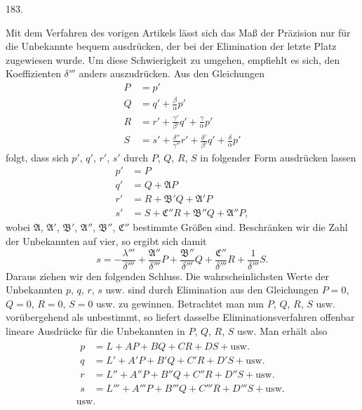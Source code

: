 \begin{center}\hypertarget{native-256-article183}{}183.\end{center}
Mit dem Verfahren des vorigen Artikels lässt sich das Maß der Präzision nur für die Unbekannte bequem ausdrücken, der bei der Elimination der letzte Platz zugewiesen wurde. Um diese Schwierigkeit zu umgehen, empfiehlt es sich, den Koeffizienten $\delta'''$ anders auszudrücken. Aus den Gleichungen
\[
\begin{aligned}
P&=p'\\
Q&=q'+\frac{\beta}{\alpha}p'\\
R&=r'+\frac{\gamma'}{\beta'}q'+\frac{\gamma}{\alpha}p'\\
S&=s'+\frac{\delta''}{\gamma''}r'+\frac{\delta'}{\beta'}q'+\frac{\delta}{\alpha}p'
\end{aligned}
\]
folgt, dass sich $p'$, $q'$, $r'$, $s'$ durch $P$, $Q$, $R$, $S$ in folgender Form ausdrücken lassen
\[
\begin{aligned}
p'&=P\\
q'&=Q+\mathfrak{A}P\\
r'&=R+\mathfrak{B}'Q+\mathfrak{A}'P\\
s'&=S+\mathfrak{C}''R+\mathfrak{B}''Q+\mathfrak{A}''P,
\end{aligned}
\]
wobei $\mathfrak{A}$, $\mathfrak{A}'$, $\mathfrak{B}'$, $\mathfrak{A}''$, $\mathfrak{B}''$, $\mathfrak{C}''$ bestimmte Größen sind. Beschränken wir die Zahl der Unbekannten auf vier, so ergibt sich damit
\[
s=-\frac{\lambda'''}{\delta'''}+\frac{\mathfrak{A}''}{\delta'''}P
+\frac{\mathfrak{B}''}{\delta'''}Q+\frac{\mathfrak{C}''}{\delta'''}R
+\frac{1}{\delta'''}S.
\]
Daraus ziehen wir den folgenden Schluss. Die wahrscheinlichsten Werte der Unbekannten $p$, $q$, $r$, $s$ usw. sind durch Elimination aus den Gleichungen $P=0$, $Q=0$, $R=0$, $S=0$ usw. zu gewinnen. Betrachtet man nun $P$, $Q$, $R$, $S$ usw. vorübergehend als unbestimmt, so liefert dasselbe Eliminationsverfahren offenbar lineare Ausdrücke für die Unbekannten in $P$, $Q$, $R$, $S$ usw. Man erhält also
\[
\begin{gathered}
\begin{aligned}
p&=L+AP+BQ+CR+DS+\text{usw.}\\
q&=L'+A'P+B'Q+C'R+D'S+\text{usw.}\\
r&=L''+A''P+B''Q+C''R+D''S+\text{usw.}\\
s&=L'''+A'''P+B'''Q+C'''R+D'''S+\text{usw.}
\end{aligned}\\
\text{usw.}
\end{gathered}
\]
